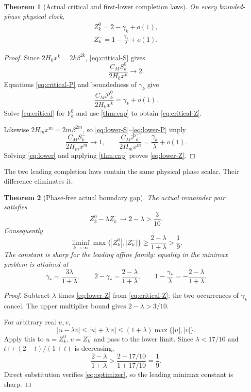 \documentclass[11pt]{article}
\newtheorem{theorem}{Theorem}[section]
\theoremstyle{remark}
\newcommand{\cP}{\mathcal P}
\begin{document}
\begin{theorem}[Actual critical and first-lower completion laws]
\label{thm:completion}
On every bounded-phase physical clock,
\begin{align}
 \boxed{Z_k^0=2-\gamma_k+o(1),}
 \label{eq:critical-Z}\\
 \boxed{Z_k^-=1-\frac{\gamma_k}{\lambda}+o(1).}
 \label{eq:lower-Z}
\end{align}
\end{theorem}

\begin{proof}
Since $2H_kx^k=2k\beta^{2k}$,
\eqref{eq:critical-S} gives
\[
 \frac{C_MS_k^0}{2H_kx^k}\longrightarrow2.
\]
Equations \eqref{eq:critical-P} and boundedness of $\gamma_k$ give
\[
 \frac{C_M\cP_k^0}{2H_kx^k}=\gamma_k+o(1).
\]
Solve \eqref{eq:critical} for $Y_k^0$ and use
\cref{thm:cap} to obtain \eqref{eq:critical-Z}.

Likewise $2H_mx^m=2m\beta^{2m}$, so
\eqref{eq:lower-S}--\eqref{eq:lower-P} imply
\[
 \frac{C_MS_k^-}{2H_mx^m}\longrightarrow1,
 \qquad
 \frac{C_M\cP_k^-}{2H_mx^m}
 =\frac{\gamma_k}{\lambda}+o(1).
\]
Solving \eqref{eq:lower} and applying \cref{thm:cap} proves
\eqref{eq:lower-Z}.
\end{proof}

The two leading completion laws contain the same physical phase scalar.
Their difference eliminates it.

\begin{theorem}[Phase-free actual boundary gap]\label{thm:gap}
The actual remainder pair satisfies
\begin{equation}\label{eq:affine-gap}
 \boxed{
 Z_k^0-\lambda Z_k^-\longrightarrow2-\lambda>\frac3{10}.}
\end{equation}
Consequently
\begin{equation}\label{eq:minimax-gap}
 \boxed{
 \liminf_{k\to\infty}\max\{|Z_k^0|,|Z_k^-|\}
 \ge\frac{2-\lambda}{1+\lambda}>\frac19.}
\end{equation}
The constant is sharp for the leading affine family: equality in the
minimax problem is attained at
\begin{equation}\label{eq:optimizer}
 \gamma_*=\frac{3\lambda}{1+\lambda},
 \qquad
 2-\gamma_*=\frac{2-\lambda}{1+\lambda},
 \qquad
 1-\frac{\gamma_*}{\lambda}
 =-\frac{2-\lambda}{1+\lambda}.
\end{equation}
\end{theorem}

\begin{proof}
Subtract $\lambda$ times \eqref{eq:lower-Z} from
\eqref{eq:critical-Z}; the two occurrences of $\gamma_k$ cancel.  The
upper multiplier bound gives $2-\lambda>3/10$.

For arbitrary real $u,v$,
\[
 |u-\lambda v|\le |u|+\lambda|v|
 \le(1+\lambda)\max\{|u|,|v|\}.
\]
Apply this to $u=Z_k^0$, $v=Z_k^-$ and pass to the lower limit.  Since
$\lambda<17/10$ and $t\mapsto(2-t)/(1+t)$ is decreasing,
\[
 \frac{2-\lambda}{1+\lambda}>
 \frac{2-17/10}{1+17/10}=\frac19.
\]
Direct substitution verifies \eqref{eq:optimizer}, so the leading minimax
constant is sharp.
\end{proof}
\end{document}
